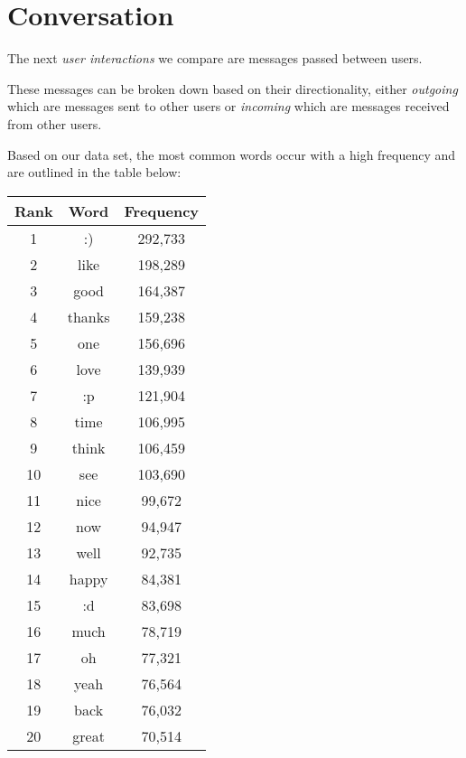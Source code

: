 \section{Conversation}
\label{sec:groups}

The next \emph{user interactions} we compare are messages passed between users.

These messages can be broken down based on their directionality, either \emph{outgoing} which are messages sent to other users or 
\emph{incoming} which are messages received from other users.

Based on our data set, the most common words occur with a high frequency and are outlined in the table below:

\begin{table}[!htbp]
\begin{minipage}[b]{.5\textwidth}
	\centering
	\begin{tabular}{|c|c|c|} %
		\hline
		\textbf{Rank} & \textbf{Word} & \textbf{Frequency}  \\ \hline
		1 & :) & 292,733 \\ \hline
		2 & like & 198,289 \\ \hline
		3 & good & 164,387 \\ \hline
		4 & thanks & 159,238 \\ \hline
		5 & one & 156,696 \\ \hline
		6 & love & 139,939 \\ \hline
		7 & :p & 121,904 \\ \hline
		8 & time & 106,995 \\ \hline
		9 & think & 106,459 \\ \hline
		10 & see & 103,690 \\ \hline
		11 & nice & 99,672 \\ \hline
		12 & now & 94,947 \\ \hline
		13 & well & 92,735 \\ \hline
		14 & happy & 84,381 \\ \hline
		15 & :d & 83,698 \\ \hline
		16 & much & 78,719 \\ \hline
		17 & oh & 77,321 \\ \hline
		18 & yeah & 76,564 \\ \hline
		19 & back & 76,032 \\ \hline
		20 & great & 70,514 \\ \hline
		\end{tabular}
\end{minipage}

\end{table}
